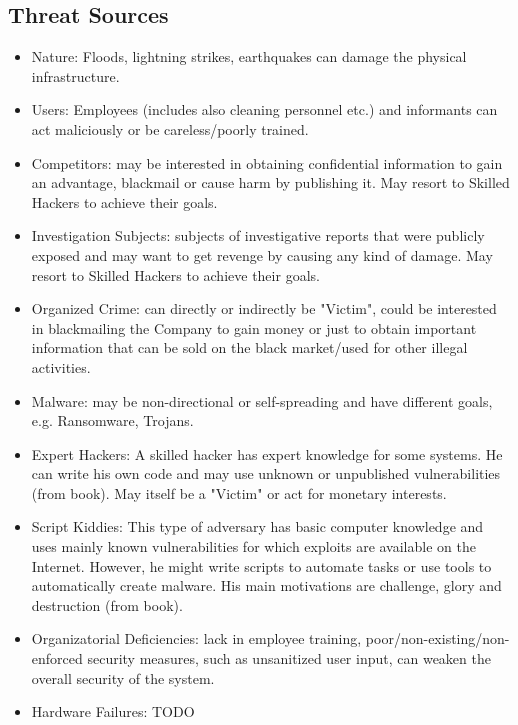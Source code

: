 \documentclass[english]{article}
\begin{document}
\subsection{Threat Sources}


\begin{itemize}
\item Nature: Floods, lightning strikes, earthquakes can damage the physical infrastructure.
\item Users: Employees (includes also cleaning personnel etc.) and informants can act maliciously or be careless/poorly trained.
\item Competitors: may be interested in obtaining confidential information to gain an advantage, blackmail or cause harm by publishing it. May resort to Skilled Hackers to achieve their goals.
\item Investigation Subjects: subjects of investigative reports that were publicly exposed and may want to get revenge by causing any kind of damage. May resort to Skilled Hackers to achieve their goals.
\item Organized Crime: can directly or indirectly be "Victim", could be interested in blackmailing the Company to gain money or just to obtain important information that can be sold on the black market/used for other illegal activities.
\item Malware: may be non-directional or self-spreading and have different goals, e.g. Ransomware, Trojans.
\item Expert Hackers: A skilled hacker has expert knowledge for some systems. He can write his own code and may use unknown or unpublished vulnerabilities (from book). May itself be a "Victim" or act for monetary interests.
\item Script Kiddies: This type of adversary has basic computer knowledge and uses mainly known vulnerabilities for which exploits are available on the Internet. However, he might write scripts to automate tasks or use tools to automatically create malware. His main motivations are challenge, glory and destruction (from book).
\item Organizatorial Deficiencies: lack in employee training, poor/non-existing/non-enforced security measures, such as unsanitized user input, can weaken the overall security of the system.
\item Hardware Failures: TODO
\end{itemize}
\end{document}
